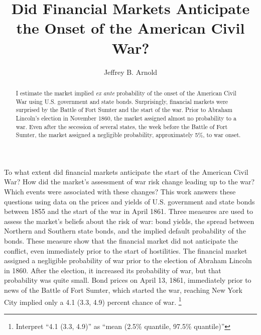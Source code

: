 \documentclass[]{article}\usepackage[]{graphicx}\usepackage[]{color}
\title{Did Financial Markets Anticipate the Onset of the American Civil War?}
\author{Jeffrey B. Arnold}
\begin{document}
\maketitle{}

\begin{abstract}
  I estimate the market implied \textit{ex ante} probability of the onset of the American Civil War using U.S. government and state bonds.
  Surprisingly, financial markets were surprised by the Battle of Fort Sumter and the start of the war.
  Prior to Abraham Lincoln's election in November 1860, the market assigned almost no probability to a war.
  Even after the secession of several states, the week before the Battle of Fort Sumter, the market assigned a negligible probability, approximately 5\%, to war onset.
\end{abstract}


To what extent did financial markets anticipate the start of the American Civil War?
How did the market's assessment of war risk change leading up to the war?
Which events were associated with these changes?
This work answers these questions using data on the prices and yields of U.S. government and state bonds between 1855 and the start of the war in April 1861.
Three measures are used to assess the market's beliefs about the risk of war: bond yields, the spread between Northern and Southern state bonds, and the implied default probability of the bonds.
These measure show that the financial market did not anticipate the conflict, even immediately prior to the start of hostilities.
The financial market assigned a negligible probability of war prior to the election of Abraham Lincoln in 1860.
After the election, it increased its probability of war, but that probability was quite small.
Bond prices on April 13, 1861, immediately prior to news of the Battle of Fort Sumter, which started the war, reaching New York City implied only a 4.1 (3.3, 4.9) percent chance of war.%
\footnote{Interpret ``4.1 (3.3, 4.9)'' as ``mean (2.5\% quantile, 97.5\% quantile)''}
\end{document}
